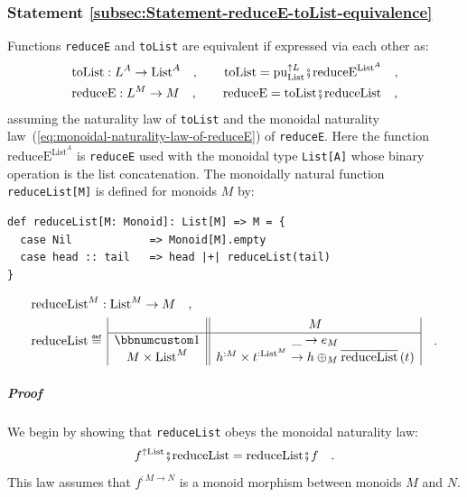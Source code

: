 \subsubsection{Statement \label{subsec:Statement-reduceE-toList-equivalence}\ref{subsec:Statement-reduceE-toList-equivalence}}

Functions \lstinline!reduceE! and \lstinline!toList! are equivalent
if expressed via each other as:
\begin{align}
 & \text{toList}:L^{A}\rightarrow\text{List}^{A}\quad,\quad\quad\text{toList}=\text{pu}_{\text{List}}^{\uparrow L}\bef\text{reduceE}^{\text{List}^{A}}\quad,\label{eq:toList-via-reduceE}\\
 & \text{reduceE}:L^{M}\rightarrow M\quad,\quad\quad\text{reduceE}=\text{toList}\bef\text{reduceList}\quad,\label{eq:reduceE-via-toList}
\end{align}
assuming the naturality law of \lstinline!toList! and the monoidal
naturality law~(\ref{eq:monoidal-naturality-law-of-reduceE}) of
\lstinline!reduceE!. Here the function $\text{reduceE}^{\text{List}^{A}}$
is \lstinline!reduceE! used with the monoidal type \lstinline!List[A]!
whose binary operation is the list concatenation. The monoidally natural
function \lstinline!reduceList[M]! is defined for monoids $M$ by:
\begin{lstlisting}
def reduceList[M: Monoid]: List[M] => M = {
  case Nil            => Monoid[M].empty
  case head :: tail   => head |+| reduceList(tail)
}
\end{lstlisting}
\begin{align*}
 & \text{reduceList}^{M}:\text{List}^{M}\rightarrow M\quad,\\
 & \text{reduceList}\triangleq\,\begin{array}{|c||c|}
 & M\\
\hline \bbnum 1 & \_\rightarrow e_{M}\\
M\times\text{List}^{M} & h^{:M}\times t^{:\text{List}^{M}}\rightarrow h\oplus_{M}\overline{\text{reduceList}}\left(t\right)
\end{array}\quad.
\end{align*}


\subparagraph{Proof}

We begin by showing that \lstinline!reduceList! obeys the monoidal
naturality law:
\[
f^{\uparrow\text{List}}\bef\text{reduceList}=\text{reduceList}\bef f\quad.
\]
This law assumes that $f^{:M\rightarrow N}$ is a monoid morphism
between monoids $M$ and $N$. 

